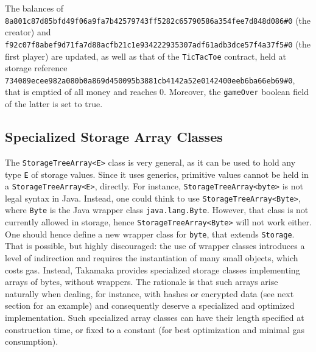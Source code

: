 \documentclass[a4paper,]{book}
\begin{document}
{The balances of
\texttt{8a801c87d85bfd49f06a9fa7b42579743ff5282c65790586a354fee7d848d086\#0}
(the creator) and
\texttt{f92c07f8abef9d71fa7d88acfb21c1e934222935307adf61adb3dce57f4a37f5\#0}
(the first player) are updated, as well as that of the
\texttt{TicTacToe} contract, held at storage reference
\texttt{734089ecee982a080b0a869d450095b3881cb4142a52e0142400eeb6ba66eb69\#0},
that is emptied of all money and reaches 0. Moreover, the
\texttt{gameOver} boolean field of the latter is set to true.

\hypertarget{specialized-storage-array-classes}{%
\subsection{Specialized Storage Array Classes
}\label{specialized-storage-array-classes}}

The \texttt{StorageTreeArray\textless{}E\textgreater{}} class is very
general, as it can be used to hold any type \texttt{E} of storage
values. Since it uses generics, primitive values cannot be held in a
\texttt{StorageTreeArray\textless{}E\textgreater{}}, directly. For
instance, \texttt{StorageTreeArray\textless{}byte\textgreater{}} is not
legal syntax in Java. Instead, one could think to use
\texttt{StorageTreeArray\textless{}Byte\textgreater{}}, where
\texttt{Byte} is the Java wrapper class \texttt{java.lang.Byte}.
However, that class is not currently allowed in storage, hence
\texttt{StorageTreeArray\textless{}Byte\textgreater{}} will not work
either. One should hence define a new wrapper class for \texttt{byte},
that extends \texttt{Storage}. That is possible, but highly discouraged:
the use of wrapper classes introduces a level of indirection and
requires the instantiation of many small objects, which costs gas.
Instead, Takamaka provides specialized storage classes implementing
arrays of bytes, without wrappers. The rationale is that such arrays
arise naturally when dealing, for instance, with hashes or encrypted
data (see next section for an example) and consequently deserve a
specialized and optimized implementation. Such specialized array classes
can have their length specified at construction time, or fixed to a
constant (for best optimization and minimal gas consumption).

}
\end{document}
